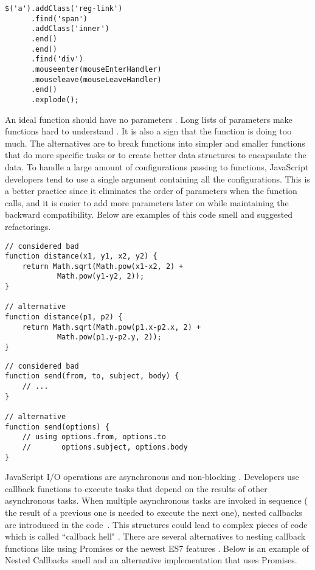 \begin{lstlisting}
$('a').addClass('reg-link')
      .find('span')
      .addClass('inner')
      .end()
      .end()
      .find('div')
      .mouseenter(mouseEnterHandler)
      .mouseleave(mouseLeaveHandler)
      .end()
      .explode();
\end{lstlisting}


 An ideal function should have no parameters \cite{martin2009clean}. Long lists of parameters make functions hard to understand \cite{fontana2012automatic}. It is also a sign that the function is doing too much. The alternatives are to break functions into simpler and smaller functions that do more specific tasks or to create better data structures to encapsulate the data. To handle a large amount of configurations passing to functions, JavaScript developers tend to use a single argument containing all the configurations. This is a better practice since it eliminates the order of parameters when the function calls, and it is easier to add more parameters later on while maintaining the backward compatibility. Below are examples of this code smell and suggested refactorings.

\begin{lstlisting}
// considered bad
function distance(x1, y1, x2, y2) {
	return Math.sqrt(Math.pow(x1-x2, 2) +
			Math.pow(y1-y2, 2));
}

// alternative
function distance(p1, p2) {
	return Math.sqrt(Math.pow(p1.x-p2.x, 2) +
			Math.pow(p1.y-p2.y, 2));
}
\end{lstlisting}
\begin{lstlisting}
// considered bad
function send(from, to, subject, body) {
	// ...
}

// alternative
function send(options) {
	// using options.from, options.to
	//		 options.subject, options.body
}
\end{lstlisting}


 JavaScript I/O operations are asynchronous and non-blocking \cite{griffin2011scaling}. Developers use callback functions to execute tasks that depend on the results of other asynchronous tasks. %
When multiple asynchronous tasks are invoked in sequence (\ie{} the result of a previous one
is needed to execute the next one), nested callbacks are introduced in the code~\cite{brodu2015toward, gallaba2015don}. This structures could lead to complex pieces of code which is called ``callback hell" \cite{ogden2015callback, brodu2015toward, fard2013jsnose}. There are several alternatives to nesting callback functions like using Promises \cite{brodu2015toward} or the newest ES7 features \cite{Jake2014es7}. Below is an example of Nested Callbacks smell and an alternative implementation that uses Promises.

